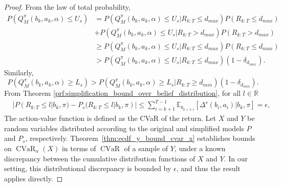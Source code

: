\documentclass[acmlarge, manuscript, screen, review, natbib=false, oneside]{acmart}
\DeclareMathOperator{\CVaR}{CVaR}
\begin{document}
\begin{proof}
	From the law of total probability,
	\begin{equation}
		\begin{aligned}
			P(Q_M^\pi(b_k, a_k,\alpha)\leq U_s) 
			&= P(Q_M^\pi(b_k, a_k,\alpha) \leq U_s| R_{k:T}\leq d_{max})P(R_{k:T}\leq d_{max}) \\
			&+P(Q_M^\pi(b_k, a_k,\alpha) \leq U_s| R_{k:T} > d_{max})P(R_{k:T} > d_{max})\\
			&\geq P(Q_M^\pi(b_k, a_k,\alpha) \leq U_s| R_{k:T}\leq d_{max})P(R_{k:T}\leq d_{max}) \\
			&>P(Q_M^\pi(b_k, a_k,\alpha) \leq U_s| R_{k:T}\leq d_{max})(1-\delta_{d_{max}}).
		\end{aligned}
	\end{equation}
	Similarly, 
	\begin{equation}
		P(Q_M^\pi(b_k, a_k,\alpha) \geq L_s) > P(Q_M^\pi(b_k, a_k,\alpha) \geq L_s | R_{k:T}\geq d_{min})(1-\delta_{d_{min}}).
	\end{equation}
	From Theorem \ref{prf:simplification_bound_over_belief_distribution}, for all $l\in \mathbb{R}$
	\begin{equation}
		\begin{aligned}
			&|P(R_{k:T} \leq l|b_k,\pi)-P_s(R_{k:T} \leq l|b_k,\pi)| 
			\leq \sum_{i=k+1}^{T-1} \mathbb{E}_{b_{{k+1}:i}}
			[\Delta^s(b_i, a_i)|b_k,\pi]=\epsilon,
		\end{aligned}
	\end{equation}
	The action-value function is defined as the CVaR of the return. Let $X$ and $Y$ be random variables distributed according to the original and simplified models $P$ and $P_s$, respectively. Theorem~\ref{thm:ecdf_y_bound_cvar_x} establishes bounds on $\CVaR_\alpha(X)$ in terms of $\CVaR$ of a sample of $Y$, under a known discrepancy between the cumulative distribution functions of $X$ and $Y$. In our setting, this distributional discrepancy is bounded by $\epsilon$, and thus the result applies directly.
\end{proof}
\end{document}
